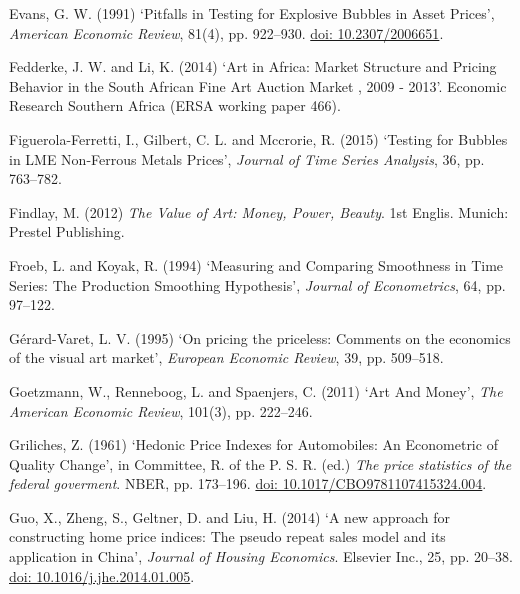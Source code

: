 \documentclass[12pt,]{article}
\begin{document}
Evans, G. W. (1991) `Pitfalls in Testing for Explosive Bubbles in Asset
Prices', \emph{American Economic Review}, 81(4), pp. 922--930.
\href{http://doi.org/10.2307/2006651}{doi: 10.2307/2006651}.

Fedderke, J. W. and Li, K. (2014) `Art in Africa: Market Structure and
Pricing Behavior in the South African Fine Art Auction Market , 2009 -
2013'. Economic Research Southern Africa (ERSA working paper 466).

Figuerola-Ferretti, I., Gilbert, C. L. and Mccrorie, R. (2015) `Testing
for Bubbles in LME Non-Ferrous Metals Prices', \emph{Journal of Time
Series Analysis}, 36, pp. 763--782.

Findlay, M. (2012) \emph{The Value of Art: Money, Power, Beauty}. 1st
Englis. Munich: Prestel Publishing.

Froeb, L. and Koyak, R. (1994) `Measuring and Comparing Smoothness in
Time Series: The Production Smoothing Hypothesis', \emph{Journal of
Econometrics}, 64, pp. 97--122.

Gérard-Varet, L. V. (1995) `On pricing the priceless: Comments on the
economics of the visual art market', \emph{European Economic Review},
39, pp. 509--518.

Goetzmann, W., Renneboog, L. and Spaenjers, C. (2011) `Art And Money',
\emph{The American Economic Review}, 101(3), pp. 222--246.

Griliches, Z. (1961) `Hedonic Price Indexes for Automobiles: An
Econometric of Quality Change', in Committee, R. of the P. S. R. (ed.)
\emph{The price statistics of the federal goverment}. NBER, pp.
173--196.
\href{http://doi.org/10.1017/CBO9781107415324.004}{doi: 10.1017/CBO9781107415324.004}.

Guo, X., Zheng, S., Geltner, D. and Liu, H. (2014) `A new approach for
constructing home price indices: The pseudo repeat sales model and its
application in China', \emph{Journal of Housing Economics}. Elsevier
Inc., 25, pp. 20--38.
\href{http://doi.org/10.1016/j.jhe.2014.01.005}{doi: 10.1016/j.jhe.2014.01.005}.
\end{document}
